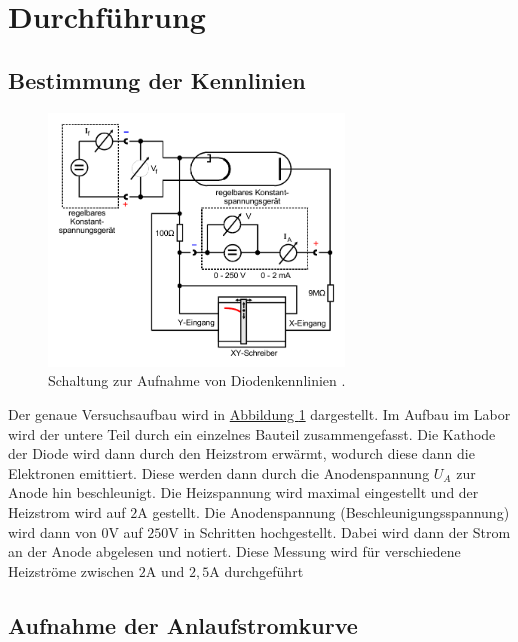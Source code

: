 \section{Durchführung}
\label{sec:Durchführung}


\subsection{Bestimmung der Kennlinien}
\label{sec:Kennlinien}

\begin{figure}
    \centering
    \includegraphics[width=0.7\textwidth]{pictures/Aufbau.pdf}
    \caption{Schaltung zur Aufnahme von Diodenkennlinien \cite{v504}.}
    \label{fig:Aufbau}
\end{figure}

Der genaue Versuchsaufbau wird in \hyperref[fig:Aufbau]{Abbildung \ref{fig:Aufbau}} dargestellt.
Im Aufbau im Labor wird der untere Teil durch ein einzelnes Bauteil zusammengefasst.
Die Kathode der Diode wird dann durch den Heizstrom erwärmt, wodurch diese dann die Elektronen emittiert.
Diese werden dann durch die Anodenspannung $U_A$ zur Anode hin beschleunigt.
Die Heizspannung wird maximal eingestellt und der Heizstrom wird auf $2 \unit\ampere$ gestellt.
Die Anodenspannung (Beschleunigungsspannung) wird dann von $0 \unit\volt$ auf $250 \unit\volt$ in Schritten hochgestellt.
Dabei wird dann der Strom an der Anode abgelesen und notiert.
Diese Messung wird für verschiedene Heizströme zwischen $2 \unit\ampere$ und $2,5 \unit\ampere$ durchgeführt

\subsection{Aufnahme der Anlaufstromkurve}

